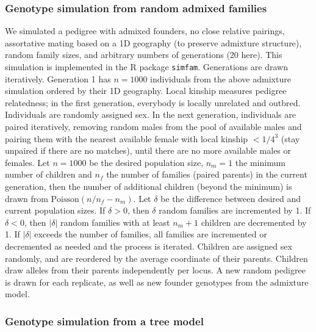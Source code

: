 \documentclass[11pt]{article}
\begin{document}
\begin{linenumbers}
\subsubsection{Genotype simulation from random admixed families}

We simulated a pedigree with admixed founders, no close relative pairings, assortative mating based on a 1D geography (to preserve admixture structure), random family sizes, and arbitrary numbers of generations (20 here).
This simulation is implemented in the R package \texttt{simfam}.
Generations are drawn iteratively.
Generation 1 has $n=1000$ individuals from the above admixture simulation ordered by their 1D geography.
Local kinship measures pedigree relatedness; in the first generation, everybody is locally unrelated and outbred.
Individuals are randomly assigned sex.
In the next generation, individuals are paired iteratively, removing random males from the pool of available males and pairing them with the nearest available female with local kinship $< 1/4^3$ (stay unpaired if there are no matches), until there are no more available males or females.
Let $n=1000$ be the desired population size, $n_m=1$ the minimum number of children and $n_f$ the number of families (paired parents) in the current generation, then the number of additional children (beyond the minimum) is drawn from $\text{Poisson}(n/n_f - n_m)$.
Let $\delta$ be the difference between desired and current population sizes.
If $\delta > 0$, then $\delta$ random families are incremented by 1.
If $\delta < 0$, then $|\delta|$ random families with at least $n_m+1$ children are decremented by 1.
If $|\delta|$ exceeds the number of families, all families are incremented or decremented as needed and the process is iterated.
Children are assigned sex randomly, and are reordered by the average coordinate of their parents.
Children draw alleles from their parents independently per locus.
A new random pedigree is drawn for each replicate, as well as new founder genotypes from the admixture model.

\subsubsection{Genotype simulation from a tree model}


\end{linenumbers}
\end{document}
